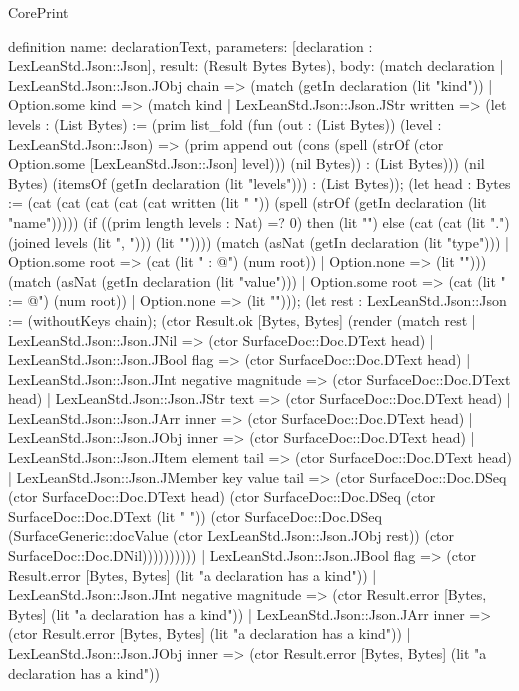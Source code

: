 \begin{lexlean}{CorePrint}
\begin{semanticmodule}
definition{
  name: declarationText,
  parameters: [declaration : LexLeanStd.Json::Json],
  result: (Result Bytes Bytes),
  body: (match declaration
    | LexLeanStd.Json::Json.JObj chain => (match (getIn declaration (lit "kind"))
      | Option.some kind => (match kind
        | LexLeanStd.Json::Json.JStr written => (let levels : (List Bytes) := (prim list_fold (fun (out : (List Bytes)) (level : LexLeanStd.Json::Json) => (prim append out (cons (spell (strOf (ctor Option.some [LexLeanStd.Json::Json] level))) (nil Bytes)) : (List Bytes))) (nil Bytes) (itemsOf (getIn declaration (lit "levels"))) : (List Bytes)); (let head : Bytes := (cat (cat (cat (cat (cat written (lit " ")) (spell (strOf (getIn declaration (lit "name"))))) (if ((prim length levels : Nat) =? 0) then (lit "") else (cat (cat (lit ".{") (joined levels (lit ", "))) (lit "}")))) (match (asNat (getIn declaration (lit "type")))
          | Option.some root => (cat (lit " : @") (num root))
          | Option.none => (lit ""))) (match (asNat (getIn declaration (lit "value")))
          | Option.some root => (cat (lit " := @") (num root))
          | Option.none => (lit ""))); (let rest : LexLeanStd.Json::Json := (withoutKeys chain); (ctor Result.ok [Bytes, Bytes] (render (match rest
          | LexLeanStd.Json::Json.JNil => (ctor SurfaceDoc::Doc.DText head)
          | LexLeanStd.Json::Json.JBool flag => (ctor SurfaceDoc::Doc.DText head)
          | LexLeanStd.Json::Json.JInt negative magnitude => (ctor SurfaceDoc::Doc.DText head)
          | LexLeanStd.Json::Json.JStr text => (ctor SurfaceDoc::Doc.DText head)
          | LexLeanStd.Json::Json.JArr inner => (ctor SurfaceDoc::Doc.DText head)
          | LexLeanStd.Json::Json.JObj inner => (ctor SurfaceDoc::Doc.DText head)
          | LexLeanStd.Json::Json.JItem element tail => (ctor SurfaceDoc::Doc.DText head)
          | LexLeanStd.Json::Json.JMember key value tail => (ctor SurfaceDoc::Doc.DSeq (ctor SurfaceDoc::Doc.DText head) (ctor SurfaceDoc::Doc.DSeq (ctor SurfaceDoc::Doc.DText (lit " ")) (ctor SurfaceDoc::Doc.DSeq (SurfaceGeneric::docValue (ctor LexLeanStd.Json::Json.JObj rest)) (ctor SurfaceDoc::Doc.DNil))))))))))
        | LexLeanStd.Json::Json.JBool flag => (ctor Result.error [Bytes, Bytes] (lit "a declaration has a kind"))
        | LexLeanStd.Json::Json.JInt negative magnitude => (ctor Result.error [Bytes, Bytes] (lit "a declaration has a kind"))
        | LexLeanStd.Json::Json.JArr inner => (ctor Result.error [Bytes, Bytes] (lit "a declaration has a kind"))
        | LexLeanStd.Json::Json.JObj inner => (ctor Result.error [Bytes, Bytes] (lit "a declaration has a kind"))
}
\end{semanticmodule}
\end{lexlean}
